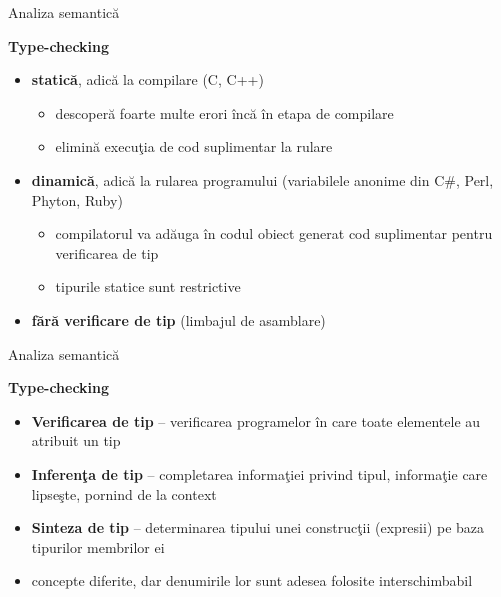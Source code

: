 \documentclass[pdf]{beamer}
\begin{document}
\begin{frame}{Analiza semantică}

\textbf{Type-checking}

\begin{itemize}
\item
\textbf{statică}, adică la compilare (C, C++)
\begin{itemize}
\item
descoperă foarte multe erori încă în etapa de compilare
\item
elimină execuţia de cod suplimentar la rulare
\end{itemize}

\item
\textbf{dinamică}, adică la rularea programului (variabilele anonime din C\#, Perl, Phyton, Ruby)
\begin{itemize}
\item
compilatorul va adăuga în codul obiect generat cod suplimentar pentru verificarea de tip
\item
tipurile statice sunt restrictive
\end{itemize}

\item
\textbf{fără verificare de tip} (limbajul de asamblare)
\end{itemize}
\end{frame}



\begin{frame}{Analiza semantică}

\textbf{Type-checking}

\begin{itemize}
\item
\textbf{Verificarea de tip} – verificarea programelor în care toate elementele au atribuit un tip

\item
\textbf{Inferenţa de tip} – completarea informaţiei privind tipul, informaţie care lipseşte, pornind de la context

\item
\textbf{Sinteza de tip} – determinarea tipului unei construcţii (expresii) pe baza tipurilor membrilor ei
\newline

\item
concepte diferite, dar denumirile lor sunt adesea folosite interschimbabil

\end{itemize}
\end{frame}
\end{document}
